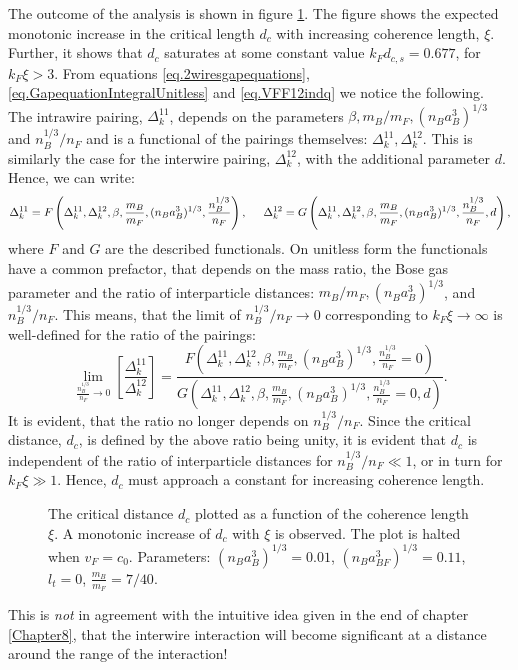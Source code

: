 The outcome of the analysis is shown in figure \ref{fig.twowirescrossoverxidepend}. The figure shows the expected monotonic increase in the critical length $d_c$ with increasing coherence length, $\xi$. Further, it shows that $d_c$ saturates at some constant value $k_Fd_{c,s} = 0.677$, for $k_F\xi > 3$. From equations \ref{eq.2wiresgapequations}, \ref{eq.GapequationIntegralUnitless} and \ref{eq.VFF12indq} we notice the following. The intrawire pairing, $\Delta^{11}_k$, depends on the parameters $\beta, m_B/m_F, (n_Ba_B^3)^{1/3}$ and $n_B^{1/3}/n_F$ and is a functional of the pairings themselves: $\Delta^{11}_k, \Delta^{12}_k$. This is similarly the case for the interwire pairing, $\Delta^{12}_k$, with the additional parameter $d$. Hence, we can write:
\begin{equation}
\Delta^{11}_k = F\left(\Delta^{11}_k, \Delta^{12}_k, \beta, \frac{m_B}{m_F}, (n_Ba_B^3)^{1/3}, \frac{n_B^{1/3}}{n_F} \right), \hspace{0.5cm} \Delta^{12}_k = G\left(\Delta^{11}_k, \Delta^{12}_k, \beta, \frac{m_B}{m_F}, (n_Ba_B^3)^{1/3}, \frac{n_B^{1/3}}{n_F}, d \right), \nonumber 
\end{equation}
where $F$ and $G$ are the described functionals. On unitless form the functionals have a common prefactor, that depends on the mass ratio, the Bose gas parameter and the ratio of interparticle distances: $m_B/m_F, (n_Ba_B^3)^{1/3}$, and $n_B^{1/3}/n_F$. This means, that the limit of $n_B^{1/3}/n_F \to 0 $ corresponding to $k_F\xi \to \infty$ is well-defined for the ratio of the pairings:
\begin{equation}
\lim_{\frac{n_B^{1/3}}{n_F} \to 0} \left[\frac{\Delta^{11}_k}{\Delta^{12}_k}\right] = \frac{F\left(\Delta^{11}_k, \Delta^{12}_k, \beta, \frac{m_B}{m_F}, (n_Ba_B^3)^{1/3}, \frac{n_B^{1/3}}{n_F} = 0 \right) }{G\left(\Delta^{11}_k, \Delta^{12}_k, \beta, \frac{m_B}{m_F}, (n_Ba_B^3)^{1/3}, \frac{n_B^{1/3}}{n_F} = 0, d \right)}. \nonumber
\end{equation}
It is evident, that the ratio no longer depends on $n_B^{1/3}/n_F$. Since the critical distance, $d_c$, is defined by the above ratio being unity, it is evident that $d_c$ is independent of the ratio of interparticle distances for $n_B^{1/3}/n_F \ll 1$, or in turn for $k_F\xi \gg 1$. Hence, $d_c$ must approach a constant for increasing coherence length.  

\begin{figure} 
\begin{center}  
  
\caption{The critical distance $d_c$ plotted as a function of the coherence length $\xi$. A monotonic increase of $d_c$ with $\xi$ is observed. The plot is halted when $v_F = c_0$. Parameters: $(n_Ba_B^3)^{1/3} = 0.01$, $(n_Ba_{BF}^3)^{1/3} = 0.11$, $l_t = 0$, $\frac{m_B}{m_F} = 7/40$. }  
\label{fig.twowirescrossoverxidepend}  
\end{center}    
\end{figure}

This is \textit{not} in agreement with the intuitive idea given in the end of chapter \ref{Chapter8}, that the interwire interaction will become significant at a distance around the range of the interaction!

 



